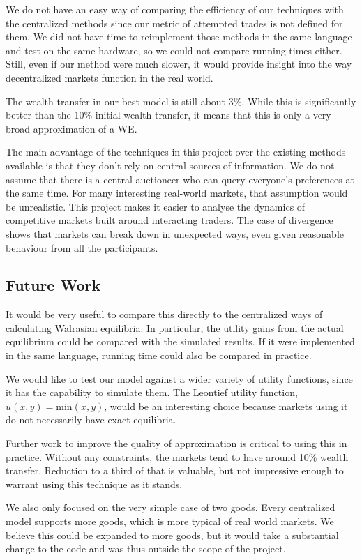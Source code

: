\documentclass[12pt,a4paper,titlepage]{article}
\begin{document}
We do not have an easy way of comparing the efficiency of our techniques with the centralized methods since our metric of attempted trades is not defined for them.
We did not have time to reimplement those methods in the same language and test on the same hardware, so we could not compare running times either.
Still, even if our method were much slower, it would provide insight into the way decentralized markets function in the real world.

The wealth transfer in our best model is still about 3\%.
While this is significantly better than the 10\% initial wealth transfer, it means that this is only a very broad approximation of a WE.

The main advantage of the techniques in this project over the existing methods available is that they don't rely on central sources of information.
We do not assume that there is a central auctioneer who can query everyone's preferences at the same time.
For many interesting real-world markets, that assumption would be unrealistic.
This project makes it easier to analyse the dynamics of competitive markets built around interacting traders.
The case of divergence shows that markets can break down in unexpected ways, even given reasonable behaviour from all the participants.

\subsection{Future Work}
It would be very useful to compare this directly to the centralized ways of calculating Walrasian equilibria.
In particular, the utility gains from the actual equilibrium could be compared with the simulated results.
If it were implemented in the same language, running time could also be compared in practice.

We would like to test our model against a wider variety of utility functions, since it has the capability to simulate them.
The Leontief utility function, $u(x,y) = \mathrm{min}(x, y)$, would be an interesting choice because markets using it do not necessarily have exact equilibria.

Further work to improve the quality of approximation is critical to using this in practice.
Without any constraints, the markets tend to have around 10\% wealth transfer. 
Reduction to a third of that is valuable, but not impressive enough to warrant using this technique as it stands.

We also only focused on the very simple case of two goods.
Every centralized model supports more goods, which is more typical of real world markets.
We believe this could be expanded to more goods, but it would take a substantial change to the code and was thus outside the scope of the project.
\end{document}
